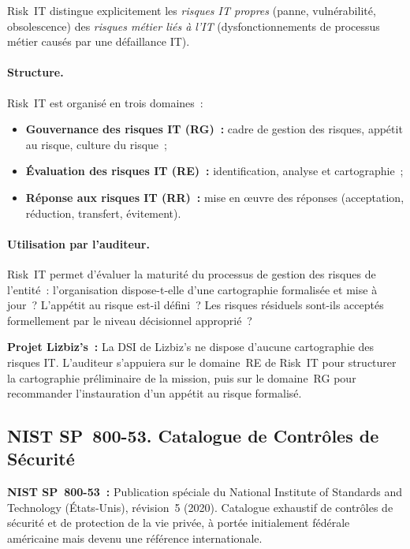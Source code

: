 Risk~IT distingue explicitement les \emph{risques IT propres} (panne, vulnérabilité,
obsolescence) des \emph{risques métier liés à l'IT} (dysfonctionnements de processus métier
causés par une défaillance IT).

\paragraph{Structure.} Risk~IT est organisé en trois domaines~:
\begin{itemize}
    \item \textbf{Gouvernance des risques IT (RG)~:} cadre de gestion des risques, appétit
        au risque, culture du risque~;
    \item \textbf{Évaluation des risques IT (RE)~:} identification, analyse et cartographie~;
    \item \textbf{Réponse aux risques IT (RR)~:} mise en œuvre des réponses (acceptation,
        réduction, transfert, évitement).
\end{itemize}

\paragraph{Utilisation par l'auditeur.} Risk~IT permet d'évaluer la maturité du processus de
gestion des risques de l'entité~: l'organisation dispose-t-elle d'une cartographie formalisée et
mise à jour~? L'appétit au risque est-il défini~? Les risques résiduels sont-ils acceptés
formellement par le niveau décisionnel approprié~?

\begin{boxlizbiz}
\textbf{Projet Lizbiz's~:}
La DSI de Lizbiz's ne dispose d'aucune cartographie des risques IT. L'auditeur s'appuiera sur le
domaine~RE de Risk~IT pour structurer la cartographie préliminaire de la mission, puis sur le
domaine~RG pour recommander l'instauration d'un appétit au risque formalisé.
\end{boxlizbiz}

\subsection{NIST SP~800-53. Catalogue de Contrôles de Sécurité}
\label{subsec:nist-800-53}

\begin{boxdef}
\textbf{NIST SP~800-53~:} Publication spéciale du National Institute of Standards and
Technology (États-Unis), révision~5 (2020). Catalogue exhaustif de contrôles de sécurité et
de protection de la vie privée, à portée initialement fédérale américaine mais devenu une
référence internationale.
\end{boxdef}

